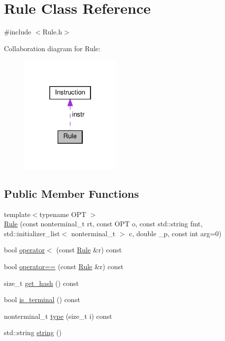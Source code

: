 \hypertarget{class_rule}{}\section{Rule Class Reference}
\label{class_rule}


{\ttfamily \#include $<$Rule.\+h$>$}



Collaboration diagram for Rule\+:\nopagebreak
\begin{figure}[H]
\begin{center}
\leavevmode
\includegraphics[width=142pt]{class_rule__coll__graph}
\end{center}
\end{figure}
\subsection*{Public Member Functions}
\begin{DoxyCompactItemize}
\item 
{\footnotesize template$<$typename O\+PT $>$ }\\\hyperlink{class_rule_a1e65fa1bce404b1513038a9dd4ffcb9f}{Rule} (const nonterminal\+\_\+t rt, const O\+PT o, const std\+::string fmt, std\+::initializer\+\_\+list$<$ nonterminal\+\_\+t $>$ c, double \+\_\+p, const int arg=0)
\item 
bool \hyperlink{class_rule_a706819fbede2c5a1b0b59f1d28cae30b}{operator$<$} (const \hyperlink{class_rule}{Rule} \&r) const
\item 
bool \hyperlink{class_rule_a183fafc8a6b43515436a1de8f63ec98d}{operator==} (const \hyperlink{class_rule}{Rule} \&r) const
\item 
size\+\_\+t \hyperlink{class_rule_a62e4d931266a65d4aad9ca3c058d7e25}{get\+\_\+hash} () const
\item 
bool \hyperlink{class_rule_a9d557e302f94bd85f5505733e8856f97}{is\+\_\+terminal} () const
\item 
nonterminal\+\_\+t \hyperlink{class_rule_a97db8e22bb8445b92779eb165bb29ae5}{type} (size\+\_\+t i) const
\item 
std\+::string \hyperlink{class_rule_a4a75588d7821c1bcf087ec6ebf82bd0f}{string} ()
\end{DoxyCompactItemize}
